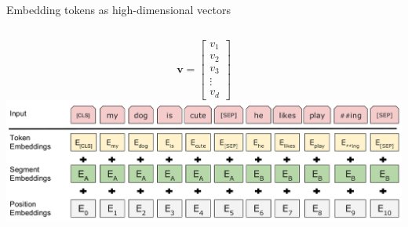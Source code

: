 \documentclass[10pt]{beamer}
\begin{document}
\begin{frame}{Embedding tokens as high-dimensional vectors}
\begin{columns}[T,onlytextwidth]
\begin{itemize}
		\end{itemize}
	\end{columns}
	\begin{columns}[T,onlytextwidth]
	\hspace*{-0.7cm} 
	\vspace{-0.4cm}
		$$
		\mathbf{v} =
		\begin{bmatrix}
			v_1 \\
			v_2 \\
			v_3 \\
			\vdots \\
			v_d
		\end{bmatrix}
		$$
		\includegraphics[height=0.3\textheight]{figures/Devlin2018 _BERTfig2.png}
\end{columns}
\end{frame}
\end{document}
